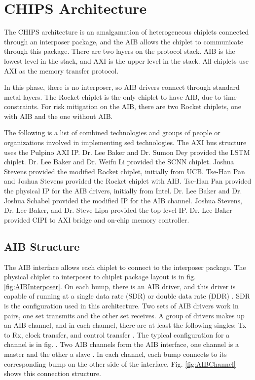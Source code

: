 \documentclass[../main.tex]{subfiles}
\begin{document}
\section{CHIPS Architecture}
\label{sec:CHIPS-Arch}
The CHIPS architecture is an amalgamation of heterogeneous chiplets connected through an interposer package, and the AIB allows the chiplet to communicate through this package\cite{AIBWhitePaper}. There are two layers on the protocol stack. AIB is the lowest level in the stack, and AXI is the upper level in the stack. All chiplets use AXI as the memory transfer protocol.

In this phase, there is no interposer, so AIB drivers connect through standard metal layers. The Rocket chiplet is the only chiplet to have AIB, due to time constraints. For risk mitigation on the AIB, there are two Rocket chiplets, one with AIB and the one without AIB. 

The following is a list of combined technologies and groups of people or organizations involved in implementing sed technologies. The AXI bus structure uses the Pulpino AXI IP. Dr. Lee Baker and Dr. Sumon Dey provided the LSTM chiplet. Dr. Lee Baker and Dr. Weifu Li provided the SCNN chiplet. Joshua Stevens provided the modified Rocket chiplet, initially from UCB. Tse-Han Pan and Joshua Stevens provided the Rocket chiplet with AIB. Tse-Han Pan provided the physical IP for the AIB drivers, initially from Intel. Dr. Lee Baker and Dr. Joshua Schabel provided the modified IP for the AIB channel. Joshua Stevens, Dr. Lee Baker, and Dr. Steve Lipa provided the top-level IP. Dr. Lee Baker provided CIPI to AXI bridge and on-chip memory controller. 

\subsection{AIB Structure}
The AIB interface allows each chiplet to connect to the interposer package. The physical chiplet to interposer to chiplet package layout is in fig. \ref{fig:AIBInterposer}. On each bump, there is an AIB driver, and this driver is capable of running at a single data rate (SDR) or double data rate (DDR)  \cite{AIBWhitePaper}. SDR is the configuration used in this architecture. Two sets of AIB drivers work in pairs, one set transmits and the other set receives. A group of drivers makes up an AIB channel, and in each channel, there are at least the following singles: Tx to Rx, clock transfer, and control transfer \cite{AIBWhitePaper}. The typical configuration for a channel is in fig. \cite{AIBWhitePaper}. Two AIB channels form the AIB interface, one channel is a master and the other a slave  \cite{AIBWhitePaper}. In each channel, each bump connects to its corresponding bump on the other side of the interface. Fig. \ref{fig:AIBChannel} shows this connection structure.  
\end{document}
